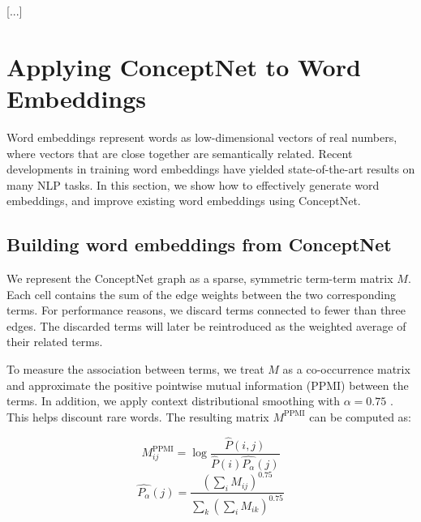 \documentclass[letterpaper]{article}
\begin{document}
[...]


\section{Applying ConceptNet to Word Embeddings}
\label{applying-conceptnet-to-word-embeddings}

Word embeddings represent words as low-dimensional vectors of real numbers,
where vectors that are close together are semantically related. Recent
developments in training word embeddings have yielded state-of-the-art results
on many NLP tasks. In this section, we show how to effectively generate
word embeddings, and improve existing word embeddings using ConceptNet.

\subsection{Building word embeddings from ConceptNet}


We represent the ConceptNet graph as a sparse, symmetric term-term matrix $M$.
Each cell contains the sum of the edge weights between the two corresponding
terms. For performance reasons, we discard terms connected to fewer than three
edges. The discarded terms will later be reintroduced as the weighted average of
their related terms.

To measure the association between terms, we treat $M$ as a co-occurrence
matrix and approximate the positive pointwise mutual information (PPMI) between
the terms. In addition, we apply context distributional smoothing with
$\alpha=0.75$ \cite{levy2015embeddings}. This helps discount rare words. The
resulting matrix $M^\text{PPMI}$ can be computed as:

$$
M^\text{PPMI}_{ij} =
\log \frac
  {\hat{P} \left(i, j\right)}
  {\hat{P} \left(i\right) \hat{P_\alpha} \left(j\right)}
$$
$$
\hat{P_\alpha} \left(j\right) =
\frac
  {\left(\sum_i{M_{ij}}\right)^{0.75}}
  {\sum_k{\left(\sum_i{M_{ik}}\right)^{0.75}}}
$$
\end{document}
